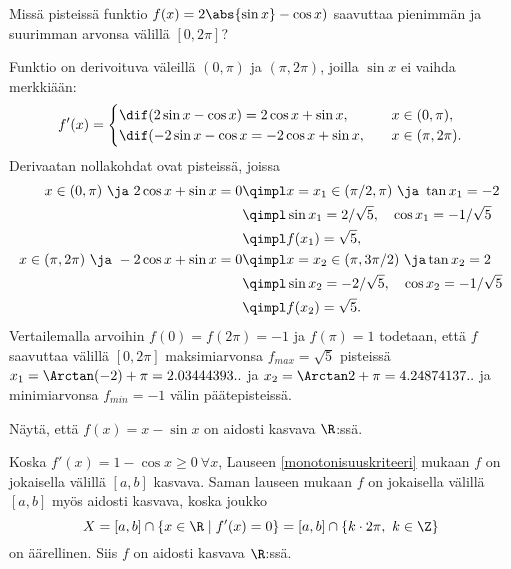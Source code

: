 \begin{Exa} Missä pisteissä funktio $f(x)=2\abs{\sin x}-\cos x)$ saavuttaa pienimmän ja
suurimman arvonsa välillä $[0,2\pi]$? 
\end{Exa}
\ratk Funktio on derivoituva väleillä $(0,\pi)$ ja $(\pi,2\pi)$, joilla $\sin x$ ei vaihda 
merkkiään:
\[
f'(x) = \begin{cases}
        \dif(2\sin x-\cos x) = 2\cos x + \sin x,    \quad &x \in (0,\pi), \\
        \dif(-2\sin x - \cos x = -2\cos x + \sin x, \quad &x \in (\pi,2\pi).
        \end{cases}
\]
Derivaatan nollakohdat ovat pisteissä, joissa 
\begin{align*}
x \in (0,\pi)\ \ja\ 2\cos x + \sin x = 0    
                        &\qimpl x=x_1 \in (\pi/2,\pi)\ \ja\ \tan x_1 = - 2 \\
                        &\qimpl \sin x_1 = 2/\sqrt{5}, \quad \cos x_1 = - 1/\sqrt{5} \\
                        &\qimpl f(x_1) = \sqrt{5}, \\
x \in (\pi,2\pi)\ \ja\ -2\cos x + \sin x = 0 
                        &\qimpl x = x_2 \in (\pi,3\pi/2)\ \ja \tan x_2 = 2 \\
                        &\qimpl \sin x_2 = - 2/\sqrt{5}, \quad \cos x_2 = - 1/\sqrt{5} \\
                        &\qimpl f(x_2) = \sqrt{5}. 
\end{align*}
Vertailemalla arvoihin $f(0)=f(2\pi)=-1$ ja $f(\pi)=1$ todetaan, että $f$ saavuttaa välillä 
$[0,2\pi]$ maksimiarvonsa $f_{max}=\sqrt{5}$ pisteissä $x_1 = \Arctan(-2)+\pi = 2.03444393..$ ja
$x_2=\Arctan 2+\pi = 4.24874137..$ ja minimiarvonsa $f_{min}=-1$ välin päätepisteissä. \loppu
\begin{Exa} Näytä, että $f(x)=x-\sin x$ on aidosti kasvava $\R$:ssä. \end{Exa}
\ratk Koska $f'(x)=1-\cos x \ge 0\ \forall x$, Lauseen \ref{monotonisuuskriteeri} mukaan $f$ on
jokaisella välillä $[a,b]$ kasvava. Saman lauseen mukaan $f$ on jokaisella välillä $[a,b]$ myös
aidosti kasvava, koska joukko
\[
X = [a,b] \cap \{x\in\R \mid f'(x)=0\} = [a,b] \cap \{k \cdot 2\pi,\ k \in \Z\}
\]
on äärellinen. Siis $f$ on aidosti kasvava $\R$:ssä. \loppu

